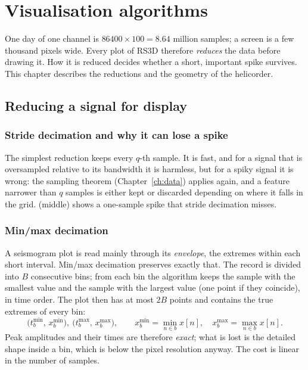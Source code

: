 \chapter{Visualisation algorithms}\label{ch:vis}

One day of one channel is $86400\times100=8.64$ million samples; a screen is a few thousand pixels wide. Every plot of
RS3D therefore \emph{reduces} the data before drawing it. How it is reduced decides whether a short, important spike
survives. This chapter describes the reductions and the geometry of the helicorder.

\section{Reducing a signal for display}
\subsection{Stride decimation and why it can lose a spike}
The simplest reduction keeps every $q$-th sample. It is fast, and for a signal that is oversampled relative to its
bandwidth it is harmless, but for a spiky signal it is wrong: the sampling theorem (Chapter~\ref{ch:data}) applies again,
and a feature narrower than $q$ samples is either kept or discarded depending on where it falls in the grid.
 (middle) shows a one-sample spike that stride decimation misses.

\subsection{Min/max decimation}
A seismogram plot is read mainly through its \emph{envelope}, the extremes within each short interval. Min/max
decimation preserves exactly that. The record is divided into $B$ consecutive bins; from each bin the algorithm keeps
the sample with the smallest value and the sample with the largest value (one point if they coincide), in time order.
The plot then has at most $2B$ points and contains the true extremes of every bin:
\begin{equation}\label{eq:minmax}
  \bigl(t^{\min}_b,\,x^{\min}_b\bigr),\ \bigl(t^{\max}_b,\,x^{\max}_b\bigr),\qquad
  x^{\min}_b=\min_{n\in b}x[n],\quad x^{\max}_b=\max_{n\in b}x[n].
\end{equation}
Peak amplitudes and their times are therefore \emph{exact}; what is lost is the detailed shape inside a bin, which
is below the pixel resolution anyway. The cost is linear in the number of samples.

